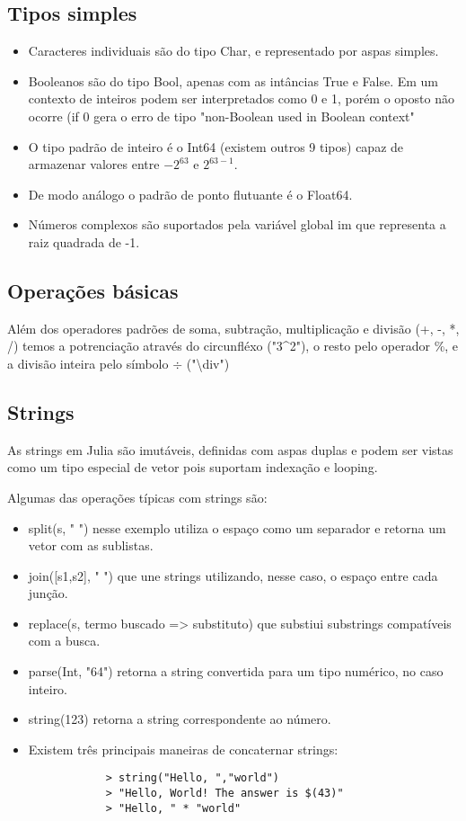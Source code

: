 \subsection{Tipos simples}
\begin{itemize}
    \item Caracteres individuais são do tipo Char, e representado por aspas simples.
    \item Booleanos são do tipo Bool, apenas com as intâncias True e False. Em um contexto de inteiros podem ser interpretados como 0 e 1, porém o oposto não ocorre (if 0 gera o erro de tipo "non-Boolean used in Boolean context"
    \item O tipo padrão de inteiro é o Int64 (existem outros 9 tipos) capaz de armazenar valores entre $-2^{63}$ e $2^{63-1}$.
    \item De modo análogo o padrão de ponto flutuante é o Float64.
    \item Números complexos são suportados pela variável global im que representa a raiz quadrada de -1.
\end{itemize}

\subsection{Operações básicas}
Além dos operadores padrões de soma, subtração, multiplicação e divisão (+, -, *, /) temos a potrenciação através do circunfléxo ("3\^{}2"), o resto pelo operador \%, e a divisão inteira pelo símbolo $\div$ ("\textbackslash div")

\subsection{Strings}
As strings em Julia são imutáveis, definidas com aspas duplas e podem ser vistas como um tipo especial de vetor pois suportam indexação e looping.


Algumas das operações típicas com strings são:
\begin{itemize}
    \item split(s, " ") nesse exemplo utiliza o espaço como um separador e retorna um vetor com as sublistas.
    \item join([s1,s2], " ") que une strings utilizando, nesse caso, o espaço entre cada junção.
    \item replace(s, {termo buscado} => {substituto}) que substiui substrings compatíveis com a busca.
    \item parse(Int, "64") retorna a string convertida para um tipo numérico, no caso inteiro.
    \item string(123) retorna a string correspondente ao número.
    \item Existem três principais maneiras de concaternar strings:
        \subitem 
        \begin{lstlisting}    
            > string("Hello, ","world")
            > "Hello, World! The answer is $(43)"
            > "Hello, " * "world"
        \end{lstlisting}
        
\end{itemize}


